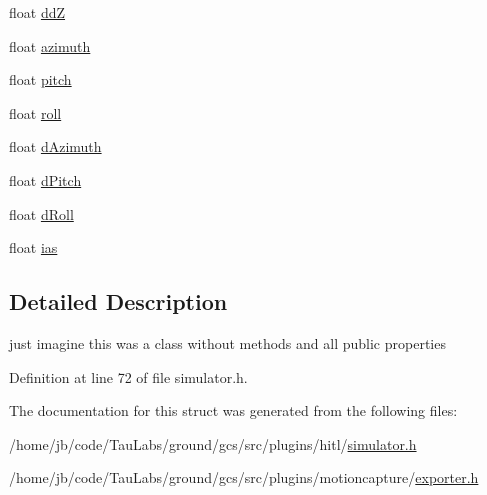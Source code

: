 \begin{DoxyCompactItemize}
\item 
float \hyperlink{group___h_i_t_l_plugin_ga7961abcc14db01ab5ba42c426e2160c5}{dd\-Z}
\item 
float \hyperlink{group___h_i_t_l_plugin_ga849192344fdd21a6a53e00920b89bbdc}{azimuth}
\item 
float \hyperlink{group___h_i_t_l_plugin_gaff7712b3622dba7f5178549057fdac4e}{pitch}
\item 
float \hyperlink{group___h_i_t_l_plugin_ga1e4f51848f0c33a0264bc1fc9acb63db}{roll}
\item 
float \hyperlink{group___h_i_t_l_plugin_gaeb046a092ad0f1b208a0341f7e6fd520}{d\-Azimuth}
\item 
float \hyperlink{group___h_i_t_l_plugin_gaff13db0c35d76e6eda91b623fb0fef8b}{d\-Pitch}
\item 
float \hyperlink{group___h_i_t_l_plugin_gad9c4016b0ff06d6f0c8208ad1a94b281}{d\-Roll}
\item 
float \hyperlink{group___mo_cap_plugin_ga30e6260b59e9997c3b1bec5bc9347ec3}{ias}
\end{DoxyCompactItemize}


\subsection{\-Detailed \-Description}
just imagine this was a class without methods and all public properties 

\-Definition at line 72 of file simulator.\-h.



\-The documentation for this struct was generated from the following files\-:\begin{DoxyCompactItemize}
\item 
/home/jb/code/\-Tau\-Labs/ground/gcs/src/plugins/hitl/\hyperlink{simulator_8h}{simulator.\-h}\item 
/home/jb/code/\-Tau\-Labs/ground/gcs/src/plugins/motioncapture/\hyperlink{exporter_8h}{exporter.\-h}\end{DoxyCompactItemize}
